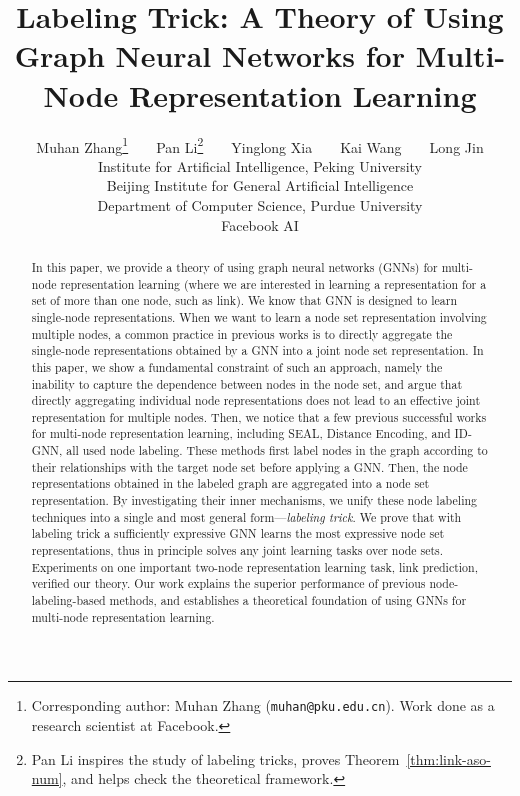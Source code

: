 \documentclass{article}
\title{Labeling Trick: A Theory of Using Graph Neural Networks for Multi-Node Representation Learning}
\author{Muhan Zhang\thanks{Corresponding author: Muhan Zhang (\texttt{muhan@pku.edu.cn}). Work done as a research scientist at Facebook.}~~~~Pan Li\thanks{Pan Li inspires the study of labeling tricks, proves Theorem~\ref{thm:link-aso-num}, and helps check the theoretical framework.}~~~~Yinglong Xia~~~~Kai Wang~~~~Long Jin\\
  Institute for Artificial Intelligence, Peking University\\ 
  Beijing Institute for General Artificial Intelligence\\ 
  Department of Computer Science, Purdue University\\ 
  Facebook AI\\
}
\begin{document}
\maketitle

\begin{abstract}

In this paper, we provide a theory of using graph neural networks (GNNs) for multi-node representation learning (where we are interested in learning a representation for a set of more than one node, such as link). We know that GNN is designed to learn single-node representations. When we want to learn a node set representation involving multiple nodes, a common practice in previous works is to directly aggregate the single-node representations obtained by a GNN into a joint node set representation. In this paper, we show a fundamental constraint of such an approach, namely the inability to capture the dependence between nodes in the node set, and argue that directly aggregating individual node representations does not lead to an effective joint representation for multiple nodes. Then, we notice that a few previous successful works for multi-node representation learning, including SEAL, Distance Encoding, and ID-GNN, all used node labeling. These methods first label nodes in the graph according to their relationships with the target node set before applying a GNN. Then, the node representations obtained in the labeled graph are aggregated into a node set representation. By investigating their inner mechanisms, we unify these node labeling techniques into a single and most general form---\textit{labeling trick}. We prove that with labeling trick a sufficiently expressive GNN learns the most expressive node set representations, thus in principle solves any joint learning tasks over node sets. Experiments on one important two-node representation learning task, link prediction, verified our theory. Our work explains the superior performance of previous node-labeling-based methods, and establishes a theoretical foundation of using GNNs for multi-node representation learning.


















\end{abstract}
\end{document}
